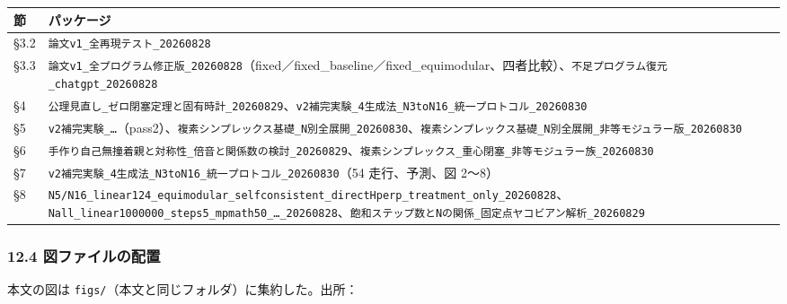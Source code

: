 \documentclass[
  10pt,
  a4paper,
]{ltjsarticle}
\newcounter{none} %
\begin{document}
{\def\LTcaptype{none} %
\begin{longtable}[]{@{}
  >{\raggedright\arraybackslash}p{}
  >{\raggedright\arraybackslash}p{}@{}}
\toprule\noalign{}
\begin{minipage}[b]{\linewidth}\raggedright
節
\end{minipage} & \begin{minipage}[b]{\linewidth}\raggedright
パッケージ
\end{minipage} \\
\midrule\noalign{}
\endhead
\bottomrule\noalign{}
\endlastfoot
§3.2 & \texttt{論文v1\_全再現テスト\_20260828} \\
§3.3 &
\texttt{論文v1\_全プログラム修正版\_20260828}（fixed／fixed\_baseline／fixed\_equimodular、四者比較）、\texttt{不足プログラム復元\_chatgpt\_20260828} \\
§4 &
\texttt{公理見直し\_ゼロ閉塞定理と固有時計\_20260829}、\texttt{v2補完実験\_4生成法\_N3toN16\_統一プロトコル\_20260830} \\
§5 &
\texttt{v2補完実験\_…}（pass2）、\texttt{複素シンプレックス基礎\_N別全展開\_20260830}、\texttt{複素シンプレックス基礎\_N別全展開\_非等モジュラー版\_20260830} \\
§6 &
\texttt{手作り自己無撞着親と対称性\_倍音と関係数の検討\_20260829}、\texttt{複素シンプレックス\_重心閉塞\_非等モジュラー族\_20260830} \\
§7 & \texttt{v2補完実験\_4生成法\_N3toN16\_統一プロトコル\_20260830}（54
走行、予測、図 2〜8） \\
§8 &
\texttt{N5/N16\_linear124\_equimodular\_selfconsistent\_directHperp\_treatment\_only\_20260828}、\texttt{Nall\_linear1000000\_steps5\_mpmath50\_…\_20260828}、\texttt{飽和ステップ数とNの関係\_固定点ヤコビアン解析\_20260829} \\
\end{longtable}
}

\subsubsection{12.4
図ファイルの配置}\label{ux56f3ux30d5ux30a1ux30a4ux30ebux306eux914dux7f6e}

本文の図は \texttt{figs/}（本文と同じフォルダ）に集約した。出所：
\end{document}
